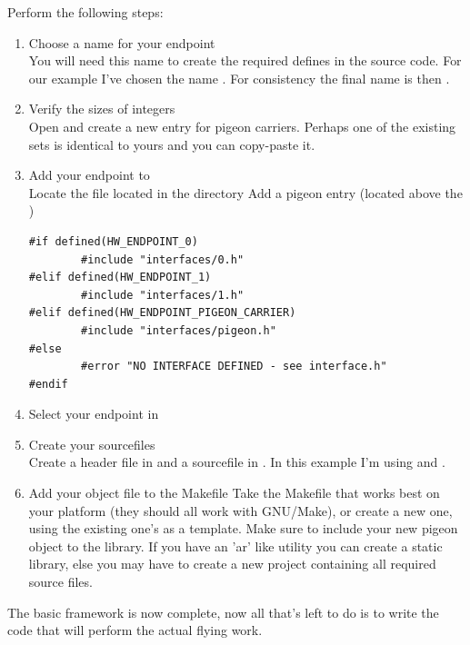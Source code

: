Perform the following steps:
\begin{enumerate}

	\item Choose a name for your endpoint\\
	You will need this name to create the required defines in the source code.
	For our example I've chosen the name .
	For consistency the final name is then .

	\item Verify the sizes of integers\\
	Open  and create a new entry for pigeon carriers. Perhaps
	one of the existing sets is identical to yours and you can copy-paste it.

	\item Add your endpoint to \\
	Locate the file  located in the directory 
	Add a pigeon entry (located above the )
\begin{lstlisting}
#if defined(HW_ENDPOINT_0)
   		#include "interfaces/0.h"
#elif defined(HW_ENDPOINT_1)
        #include "interfaces/1.h"
#elif defined(HW_ENDPOINT_PIGEON_CARRIER)
        #include "interfaces/pigeon.h"
#else
        #error "NO INTERFACE DEFINED - see interface.h"
#endif
\end{lstlisting}

	\item Select your endpoint in 
	
	\item Create your sourcefiles\\
	Create a header file in  and a sourcefile in .
	In this example I'm using  and .

	\item Add your object file to the Makefile
	Take the Makefile that works best on your platform (they should all work with
	GNU/Make), or create a new one, using the existing one's as a template.
	Make sure to include your new pigeon object to the library.
	If you have an 'ar' like utility you can create a static library, else you may
	have to create a new project containing all required source files.

\end{enumerate}

The basic framework is now complete, now all that's left to do is to write the code
that will perform the actual flying work.

